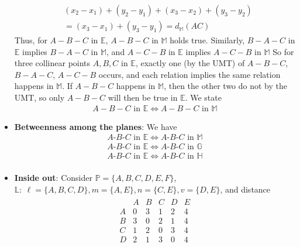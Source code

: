 \documentclass{report}
\begin{document}
\begin{itemize}
            \begin{align*}
                &(x_{2} - x_{1}) + (y_{2} - y_{1}) +(x_{3} -x_{2}) + (y_{3} - y_{2}) \\
                &=(x_{3}-x_{1}) + (y_{3} - y_{1}) = d_{\mathbb{M}}(AC)
            \end{align*}
            Thus, for $ A-B-C$ in $\mathbb{E}$, $A-B-C$ in $\mathbb{M}$ holds true. Similarly, $B-A-C$ in $\mathbb{E}$ implies $B-A-C$ in $\mathbb{M}$, and $A-C-B$ in $\mathbb{E}$ implies $A-C-B$ in $\mathbb{M}$
            \bigbreak \noindent 
            So for three collinear points $A,B,C$ in $\mathbb{E} $, exactly one (by the UMT) of $A-B-C$, $B-A-C$, $A-C-B$ occurs, and each relation implies the same relation happens in $\mathbb{M}$.
            \bigbreak \noindent 
            If $A-B-C$ happens in $\mathbb{M}$, then the other two do not by the UMT,  so only $A-B-C$ will then be true in $\mathbb{E}$. We state
            \begin{align*}
                A-B-C \text{ in } \mathbb{E} \iff A-B-C \text{ in } \mathbb{M}
            \end{align*}
        \item \textbf{Betweenness among the planes}: We have
            \begin{align*}
                A\text{-}B\text{-}C \text{ in } \mathbb{E} \iff A\text{-}B\text{-}C \text{ in } \mathbb{M} \\
                A\text{-}B\text{-}C \text{ in } \mathbb{E} \iff A\text{-}B\text{-}C \text{ in } \mathbb{G} \\
                A\text{-}B\text{-}C \text{ in } \mathbb{E} \iff A\text{-}B\text{-}C \text{ in } \mathbb{H} \\
            \end{align*}
        \item \textbf{Inside out}: Consider $\mathbb{P} = \{A,B,C,D,E,F\}$, $\mathbb{L}:\ \ell = \{A,B,C,D\}, m = \{A,E\}, n  = \{C,E\} , v = \{D,E\} $, and distance
            \begin{align*}
                \begin{array}{c|ccccc}
                   &A&B&C&D&E \\ 
                    A & 0 & 3 & 1 & 2 & 4\\
                    B &  3 & 0 & 2  & 1 & 4\\
                    C &  1 & 2 & 0 & 3 & 4\\
                    D & 2 &1 & 3 & 0 & 4\\

\end{array}
\end{align*}
\end{itemize}
\end{document}
